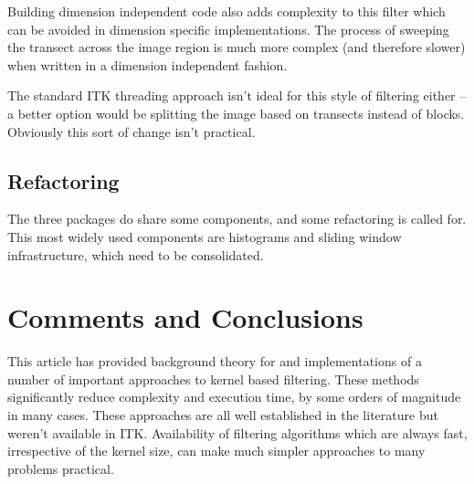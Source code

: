 \documentclass{InsightArticle}
\begin{document}
Building dimension independent code also adds complexity to this filter which can be avoided in
dimension specific implementations. The process of sweeping the transect across the image region
is much more complex (and therefore slower) when written in a dimension independent fashion.

The standard ITK threading approach isn't ideal for this style of filtering either -- a better 
option would be splitting the image based on transects instead of blocks. Obviously this
sort of change isn't practical.

\subsection{Refactoring}
The three packages do share some components, and some refactoring is
called for. This most widely used components are histograms and
sliding window infrastructure, which need to be consolidated.

\section{Comments and Conclusions}
This article has provided background theory for and implementations of
a number of important approaches to kernel based filtering. These
methods significantly reduce complexity and execution time, by some
orders of magnitude in many cases. These approaches are all well
established in the literature but weren't available in
ITK. Availability of filtering algorithms which are always fast,
irrespective of the kernel size, can make much simpler approaches to
many problems practical.

\appendix





\nocite{ITKSoftwareGuide}
\end{document}
